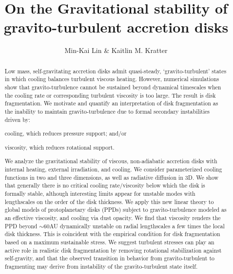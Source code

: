\documentclass[iop, numberedappendix]{emulateapj}
\begin{document}
\title{On the Gravitational stability of gravito-turbulent accretion disks}
\author{Min-Kai Lin \& Kaitlin M. Kratter}

\begin{abstract}
  Low mass, self-gravitating accretion disks admit quasi-steady,
  `gravito-turbulent' states in which cooling balances turbulent viscous 
  heating. However, numerical simulations show that gravito-turbulence
  cannot be sustained beyond dynamical timescales when the cooling
  rate or corresponding turbulent viscosity is too large. The result is disk fragmentation.         
  We motivate and quantify an interpretation of disk 
  fragmentation as the inability to maintain gravito-turbulence due to  
  formal secondary instabilities driven by:  
\begin{inparaenum}[1)] 
\item 
  cooling, which reduces pressure support; and/or
\item 
  viscosity, which reduces rotational support. 
\end{inparaenum}
We analyze the gravitational stability of viscous, non-adiabatic
accretion disks with internal heating, external irradiation, and cooling.  
We consider parameterized cooling functions in two and three dimensions,
as well as 
radiative diffusion in 3D. We show that 
generally there is no critical cooling rate/viscosity below which 
the disk is formally stable, although interesting limits appear 
for unstable modes with lengthscales on the order of the disk thickness.   
We apply this new linear theory to 
global models of protoplanetary disks (PPDs) subject to
gravito-turbulence modeled as an effective 
viscosity, and cooling via dust opacity. 
We find that viscosity renders the PPD beyond $\sim 60$AU dynamically
unstable on radial %
lengthscales a few times the local disk thickness. This is coincident 
with the empirical condition for disk fragmentation based on a
maximum sustainable stress. 
We suggest turbulent stresses can play an active role in realistic disk 
fragmentation by removing rotational stabilization against 
self-gravity, and that the observed transition in behavior from 
gravito-turbulent to fragmenting may derive from  
instability of the gravito-turbulent state itself.
\end{abstract}
\end{document}
